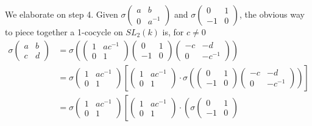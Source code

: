 We elaborate on step 4. Given $\sigma\left(\begin{matrix}a & b \\ 0 & a^{-1}\end{matrix}\right)$ and $\sigma\left(\begin{matrix}0 & 1\\-1 & 0\end{matrix}\right)$, the obvious way to piece together a 1-cocycle on $SL_2(k)$ is, for $c\neq 0$
\begin{align}\label{fullsigma}
	\sigma\left(\begin{matrix}a & b\\c & d\end{matrix}\right)
	&=
	\sigma\left(
		\left(\begin{matrix}1 & ac^{-1}\\0 & 1\end{matrix}\right)
		\left(\begin{matrix}0 & 1\\-1 & 0\end{matrix}\right)
		\left(\begin{matrix}-c & -d\\0 & -c^{-1}\end{matrix}\right)
	\right) \nonumber \\
	&=
	\sigma\left(\begin{matrix}1 & ac^{-1}\\0 & 1\end{matrix}\right)\left[
		\left(\begin{matrix}1 & ac^{-1}\\0 & 1\end{matrix}\right)\cdot
	\sigma\left(
		\left(\begin{matrix}0 & 1\\-1 & 0\end{matrix}\right)
		\left(\begin{matrix}-c & -d\\0 & -c^{-1}\end{matrix}\right)
	\right)
	\right]\nonumber \\
	&=
	\sigma\left(\begin{matrix}1 & ac^{-1}\\0 & 1\end{matrix}\right)\left[
		\left(\begin{matrix}1 & ac^{-1}\\0 & 1\end{matrix}\right)\cdot
	\left(\sigma
		\left(\begin{matrix}0 & 1\\-1 & 0\end{matrix}\right)

\end{align}
